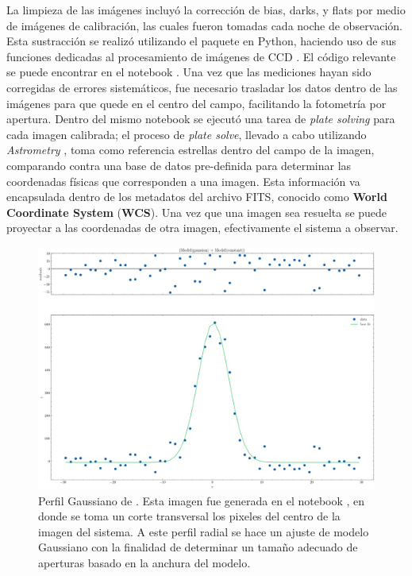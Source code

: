 La limpieza de las imágenes incluyó la corrección de bias, darks, y flats por
medio de imágenes de calibración, las cuales fueron tomadas cada noche de
observación. Esta sustracción se realizó utilizando el paquete  en
Python, haciendo uso de sus funciones dedicadas al procesamiento de imágenes de
CCD \citet{ccdproc241}. El código relevante se puede encontrar en el notebook
\href{https://github.com/KnightIV/UANL_MAPTA_Observaciones/blob/main/analisis/iturbide/photometry_clean.ipynb}{}.
Una vez que las mediciones hayan sido corregidas de errores sistemáticos, fue
necesario trasladar los datos dentro de las imágenes para que \atoObjId quede en
el centro del campo, facilitando la fotometría por apertura. Dentro del mismo
notebook
\href{https://github.com/KnightIV/UANL_MAPTA_Observaciones/blob/main/analisis/iturbide/photometry_clean.ipynb}{}
se ejecutó una tarea de \textit{plate solving} para cada imagen calibrada; el
proceso de \textit{plate solve}, llevado a cabo utilizando \textit{Astrometry}
\citet{astrometry}, toma como referencia estrellas dentro del campo de la
imagen, comparando contra una base de datos pre-definida para determinar las
coordenadas físicas que corresponden a una imagen. Esta información va
encapsulada dentro de los metadatos del archivo FITS, conocido como
\textbf{World Coordinate System} (\textbf{WCS}). Una vez que una imagen sea
resuelta se puede proyectar a las coordenadas de otra imagen, efectivamente
 el sistema a observar.

\begin{figure}[!ht]
	\centering
	\includegraphics[scale=0.44]{Observaciones/Secciones/Figures/Pixel Radial Profile - Gaussian.png}
	\caption{Perfil Gaussiano de \atoObjId. Esta imagen fue generada en el
	notebook
	\href{https://github.com/KnightIV/UANL_MAPTA_Observaciones/blob/main/analisis/iturbide/iraf/qphot_params_helper.ipynb}{},
	en donde se toma un corte transversal los pixeles del centro de la imagen
	del sistema. A este perfil radial se hace un ajuste de modelo Gaussiano con
	la finalidad de determinar un tamaño adecuado de aperturas basado en la
	anchura del modelo.}
	\label{pixelGaussProfile}
\end{figure}

